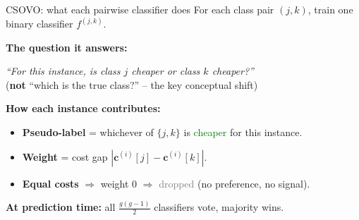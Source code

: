 \documentclass[11pt,compress,t,notes=noshow, xcolor=table]{beamer}
\newcommand{\cv}{\mathbf{c}}
\begin{document}
\begin{frame}{CSOVO: what each pairwise classifier does}
    \small
    For each class pair $(j, k)$, train one binary classifier $f^{(j,k)}$.

    \vspace{10pt}
    \textbf{The question it answers:}
    \begin{center}
        \emph{``For this instance, is class $j$ cheaper or class $k$ cheaper?''}\\[3pt]
        (\textbf{not} ``which is the true class?'' -- the key conceptual shift)
    \end{center}

    \vspace{8pt}
    \textbf{How each instance contributes:}
    \begin{itemize}
        \item \textbf{Pseudo-label} = whichever of $\{j, k\}$ is \textcolor{green}{cheaper} for this instance.
        \item \textbf{Weight} = cost gap $|\cv^{(i)}[j] - \cv^{(i)}[k]|$.
        \item \textbf{Equal costs} $\Rightarrow$ weight $0$ $\Rightarrow$ \textcolor{gray}{dropped} (no preference, no signal).
    \end{itemize}

    \vspace{8pt}
    \textbf{At prediction time:} all $\frac{g(g-1)}{2}$ classifiers vote, majority wins.
\end{frame}
\end{document}
